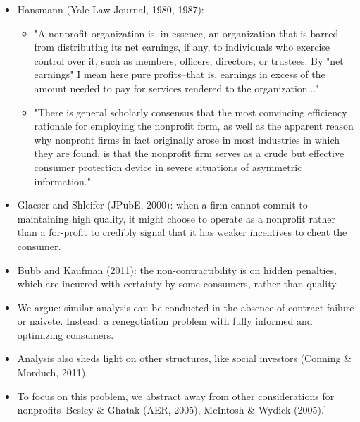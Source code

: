 \documentclass[11pt]{article}%
\providecommand{\DIFaddend}{} %
\providecommand{\DIFdelbegin}{} %
\providecommand{\DIFdelend}{} %
\begin{document}
\DIFaddend \begin{itemize}
\item Hansmann (Yale Law Journal, 1980, 1987):

\begin{itemize}
\item "A nonprofit organization is, in essence, an organization that is barred
from distributing its net earnings, if any, to individuals who exercise
control over it, such as members, officers, directors, or trustees. By "net
earnings" I mean here pure profits--that is, earnings in excess of the amount
needed to pay for services rendered to the organization..."

\item "There is general scholarly consensus that the most convincing
efficiency rationale for employing the nonprofit form, as well as the apparent
reason why nonprofit firms in fact originally arose in most industries in
which they are found, is that the nonprofit firm serves as a crude but
effective consumer protection device in severe situations of asymmetric information."
\end{itemize}

\item Glaeser and Shleifer (JPubE, 2000): when a firm cannot commit to
maintaining high quality, it might choose to operate as a nonprofit rather
than a for-profit to credibly signal that it has weaker incentives to cheat
the consumer.

\item Bubb and Kaufman (2011): the non-contractibility is on hidden penalties,
which are incurred with certainty by some consumers, rather than quality.

\item We argue: similar analysis can be conducted in the absence of contract
failure or naivete. Instead: a renegotiation problem with fully informed and
optimizing consumers.

\item Analysis also sheds light on other structures, like social investors
(Conning \& Morduch, 2011).

\item \lbrack To focus on this problem, we abstract away from other
considerations for nonprofits--Besley \& Ghatak (AER, 2005), McIntosh \&
Wydick (2005).]
\end{itemize}

\DIFdelbegin %
\DIFdelend %
\end{document}
